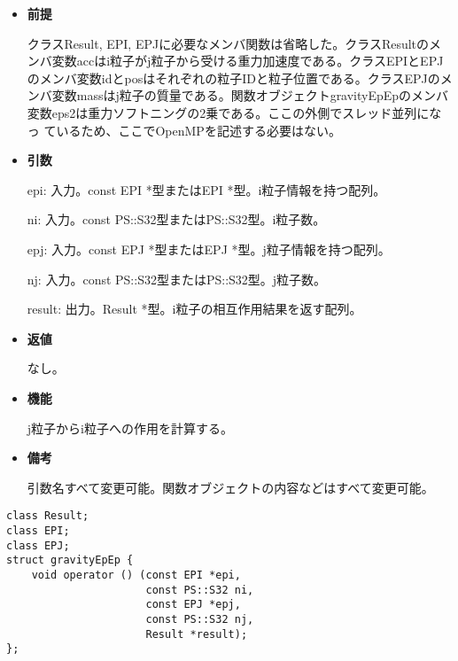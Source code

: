 \begin{itemize}

\item {\bf 前提}

  クラスResult, EPI, EPJに必要なメンバ関数は省略した。クラスResultのメ
  ンバ変数accはi粒子がj粒子から受ける重力加速度である。クラスEPIとEPJ
  のメンバ変数idとposはそれぞれの粒子IDと粒子位置である。クラスEPJのメ
  ンバ変数massはj粒子の質量である。関数オブジェクトgravityEpEpのメンバ
  変数eps2は重力ソフトニングの2乗である。ここの外側でスレッド並列になっ
  ているため、ここでOpenMPを記述する必要はない。

\item {\bf 引数}

  epi: 入力。const EPI *型またはEPI *型。i粒子情報を持つ配列。

  ni: 入力。const PS::S32型またはPS::S32型。i粒子数。

  epj: 入力。const EPJ *型またはEPJ *型。j粒子情報を持つ配列。
  
  nj: 入力。const PS::S32型またはPS::S32型。j粒子数。

  result: 出力。Result *型。i粒子の相互作用結果を返す配列。

\item {\bf 返値}

  なし。
  
\item {\bf 機能}

  j粒子からi粒子への作用を計算する。
  
\item {\bf 備考}

  引数名すべて変更可能。関数オブジェクトの内容などはすべて変更可能。
  
\end{itemize}
\fi

\begin{lstlisting}[caption=calcForceEpEp]
class Result;
class EPI;
class EPJ;
struct gravityEpEp {
    void operator () (const EPI *epi,
                      const PS::S32 ni,
                      const EPJ *epj,
                      const PS::S32 nj,
                      Result *result);
};
\end{lstlisting}

